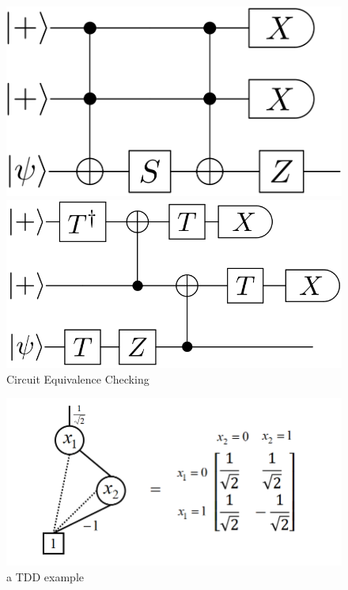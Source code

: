 \documentclass[aspectratio=1610,18pt]{ctexbeamer}
\begin{document}
\begin{frame}
  \begin{figure}
    \centering
    \begin{minipage}{0.3\textwidth}
      \includegraphics[width=\textwidth]{rus1.png}
    \end{minipage}
    \quad
    \begin{minipage}{0.3\textwidth}
      \includegraphics[width=\textwidth]{rus2.png}
    \end{minipage}
    \caption{\Large Circuit Equivalence Checking}
  \end{figure}
\end{frame}
\begin{frame}
  \begin{figure}
    \includegraphics[width = .8\textwidth]{TDD_H_gate2.png}
    \caption{\Large a TDD example}
  \end{figure}
\end{frame}
\end{document}
